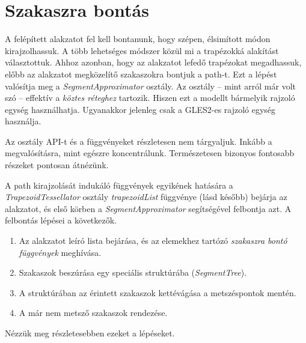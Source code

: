 \documentclass[12pt]{report}
\theoremstyle{definition}
\newcommand{\func}[1]{{\textsl{#1}}}
\begin{document}
  \section{Szakaszra bontás}

A felépített alakzatot fel kell bontanunk, hogy szépen, élsimított módon
kirajzolhassuk. A több lehetséges módszer közül mi a trapézokká alakítást
választottuk. Ahhoz azonban, hogy az alakzatot lefedő trapézokat megadhassuk,
előbb az alakzatot megközelítő szakaszokra bontjuk a path-t. Ezt a lépést
valósítja meg a \func{SegmentApproximator} osztály. Az osztály -- mint arról
már volt szó -- effektív a \emph{köztes réteghez} tartozik. Hiszen ezt a
modellt bármelyik rajzoló egység használhatja. Ugyanakkor jelenleg csak a
GLES2-es rajzoló egység használja.

Az osztály API-t és a függvényeket részletesen nem tárgyaljuk. Inkább a
megvalósításra, mint egészre koncentrálunk. Természetesen bizonyos fontosabb
részeket pontosan átnézünk.

A path kirajzolását indukáló függvények egyikének hatására a
\func{TrapezoidTessellator} osztály \func{trapezoidList} függvénye (lásd
később) bejárja az alakzatot, és első körben a \func{SegmentApproximator}
segítségével felbontja azt. A felbontás lépései a következők.
  \begin{enumerate}
    \item Az alakzatot leíró lista bejárása, és az elemekhez tartózó
    \emph{szakaszra bontó függvények} meghívása.
    \item Szakaszok beszúrása egy speciális struktúrába (\func{SegmentTree}).
    \item A struktúrában az érintett szakaszok kettévágása a metszéspontok
    mentén.
    \item A már nem metsző szakaszok rendezése.
  \end{enumerate}
Nézzük meg részletesebben ezeket a lépéseket.
\end{document}
